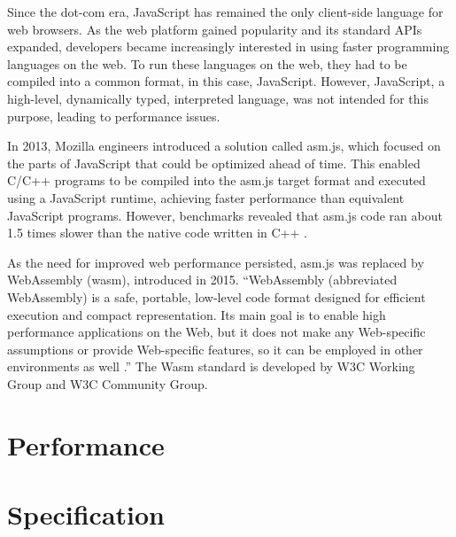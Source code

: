 Since the dot-com era, JavaScript has remained the only client-side language for web browsers. As the web platform gained popularity and its standard APIs expanded, developers became increasingly interested in using faster programming languages on the web. To run these languages on the web, they had to be compiled into a common format, in this case, JavaScript. However, JavaScript, a high-level, dynamically typed, interpreted language, was not intended for this purpose, leading to performance issues.

In 2013, Mozilla engineers introduced a solution called asm.js, which focused on the parts of JavaScript that could be optimized ahead of time. This enabled C/C++ programs to be compiled into the asm.js target format and executed using a JavaScript runtime, achieving faster performance than equivalent JavaScript programs. However, benchmarks revealed that asm.js code ran about 1.5 times slower than the native code written in C++ \cite{zakai_2013_gap}.

As the need for improved web performance persisted, asm.js was replaced by WebAssembly (wasm), introduced in 2015.
“WebAssembly (abbreviated \Gls{WebAssembly}) is a safe, portable, low-level code format designed for efficient execution and compact representation. Its main goal is to enable high performance applications on the Web, but it does not make any Web-specific assumptions or provide Web-specific features, so it can be employed in other environments as well \cite[p.~1]{webassemblycommunitygroup_2023_webassembly}.”
The Wasm standard is developed by W3C Working Group and W3C Community Group. 

\section{Performance}



\section{Specification}
\label{sec:specification}

